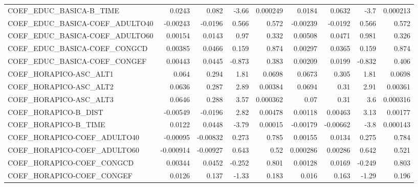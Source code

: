 \begin{tabular}{lrrrrrrrr}
COEF\_EDUC\_BASICA-B\_TIME           &      0.0243 &        0.082 &    -3.66 & 0.000249 &     0.0184 &      0.0632 &         -3.7 &      0.000213 \\
COEF\_EDUC\_BASICA-COEF\_ADULTO40    &    -0.00243 &      -0.0196 &    0.566 &    0.572 &   -0.00239 &     -0.0192 &        0.566 &         0.572 \\
COEF\_EDUC\_BASICA-COEF\_ADULTO60    &     0.00154 &       0.0143 &     0.97 &    0.332 &    0.00508 &      0.0471 &        0.981 &         0.326 \\
COEF\_EDUC\_BASICA-COEF\_CONGCD      &     0.00385 &       0.0466 &    0.159 &    0.874 &    0.00297 &      0.0365 &        0.159 &         0.874 \\
COEF\_EDUC\_BASICA-COEF\_CONGEF      &     0.00443 &       0.0445 &   -0.873 &    0.383 &    0.00209 &      0.0199 &       -0.832 &         0.406 \\
COEF\_HORAPICO-ASC\_ALT1            &       0.064 &        0.294 &     1.81 &   0.0698 &     0.0673 &       0.305 &         1.81 &        0.0698 \\
COEF\_HORAPICO-ASC\_ALT2            &      0.0636 &        0.287 &     2.89 &  0.00384 &     0.0694 &        0.31 &         2.91 &       0.00361 \\
COEF\_HORAPICO-ASC\_ALT3            &      0.0646 &        0.288 &     3.57 & 0.000362 &       0.07 &        0.31 &          3.6 &      0.000316 \\
COEF\_HORAPICO-B\_DIST              &    -0.00549 &      -0.0196 &     2.82 &  0.00478 &    0.00118 &     0.00463 &         3.13 &       0.00177 \\
COEF\_HORAPICO-B\_TIME              &      0.0122 &       0.0448 &    -3.79 &  0.00015 &   -0.00179 &    -0.00662 &         -3.8 &      0.000143 \\
COEF\_HORAPICO-COEF\_ADULTO40       &    -0.00095 &     -0.00832 &    0.273 &    0.785 &    0.00155 &      0.0134 &        0.275 &         0.784 \\
COEF\_HORAPICO-COEF\_ADULTO60       &   -0.000914 &     -0.00927 &    0.643 &     0.52 &   0.000286 &     0.00286 &        0.642 &         0.521 \\
COEF\_HORAPICO-COEF\_CONGCD         &     0.00344 &       0.0452 &   -0.252 &    0.801 &    0.00128 &      0.0169 &       -0.249 &         0.803 \\
COEF\_HORAPICO-COEF\_CONGEF         &      0.0126 &        0.137 &    -1.33 &    0.183 &      0.016 &       0.163 &        -1.29 &         0.196 \\

\end{tabular}

